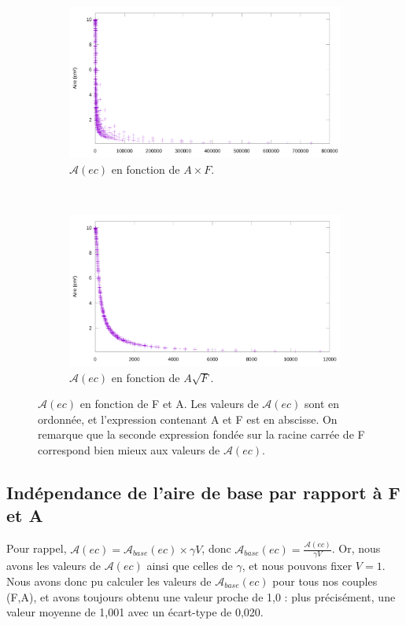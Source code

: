	\begin{figure}[!htb]
		\centering
		\begin{subfigure}[t]{\textwidth}
			\centering
			\includegraphics[width=\textwidth]{figures/ch4/af2area}
			\caption{$\mathcal{A}(ec)$ en fonction de $A\times{}F$.}
			\label{fig:af2area}
		\end{subfigure}
		~
		\begin{subfigure}[t]{\textwidth}
			\centering
			\includegraphics[width=\textwidth]{figures/ch4/asqrtf2area}
			\caption{$\mathcal{A}(ec)$ en fonction de $A\sqrt{F}$.}
			\label{fig:asqrtf2area}
		\end{subfigure}
		\caption[$\mathcal{A}(ec)$ en fonction de F et A, bis]{$\mathcal{A}(ec)$ en fonction de F et A. Les valeurs de $\mathcal{A}(ec)$ sont en ordonnée, et l'expression contenant A et F est en abscisse. On remarque que la seconde expression fondée sur la racine carrée de F correspond bien mieux aux valeurs de $\mathcal{A}(ec)$.}
		\label{fig:areaVentropy}
	\end{figure}
	
	\subsection{Indépendance de l'aire de base par rapport à F et A}
	Pour rappel, $\mathcal{A}(ec) = \mathcal{A}_{base}(ec) \times \gamma{}V$, donc $\mathcal{A}_{base}(ec) = \frac{\mathcal{A}(ec)}{\gamma{}V}$. Or, nous avons les valeurs de $\mathcal{A}(ec)$ ainsi que celles de $\gamma$, et nous pouvons fixer $V = 1$. Nous avons donc pu calculer les valeurs de $\mathcal{A}_{base}(ec)$ pour tous nos couples (F,A), et avons toujours obtenu une valeur proche de 1,0 : plus précisément, une valeur moyenne de 1,001 avec un écart-type de 0,020.
	
